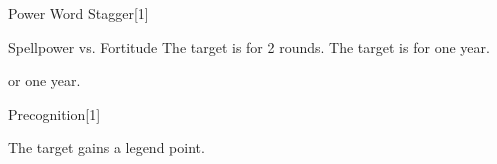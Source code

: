 \begin{spellsection}{Power Word Stagger}[1]
    \begin{spellheader}
    \end{spellheader}
    \begin{spellcontent}
        \begin{spelltargetinginfo}
        \end{spelltargetinginfo}
        \begin{spelleffects}
            \begin{spellattack}{Spellpower vs. Fortitude}
                \spellsuccess The target is \staggered for 2 rounds.
                \spellcritical The target is \staggered for one year.
            \end{spellattack}
            \spelldur \durbrief or one year.
        \end{spelleffects}
    \end{spellcontent}
    \begin{spellfooter}
        \miscastrandom
    \end{spellfooter}
\end{spellsection}

\begin{spellsection}{Precognition}[1]
    \begin{spellheader}
    \end{spellheader}
    \begin{spellcontent}
        \begin{spelltargetinginfo}
        \end{spelltargetinginfo}
        \begin{spelleffects}
            \spelleffect The target gains a legend point.
            \spelldur \durshort \dismissable
        \end{spelleffects}
    \end{spellcontent}
    \begin{spellfooter}
        \miscastexplode
    \end{spellfooter}
    \begin{spellaugments}
    \end{spellaugments}
\end{spellsection}


